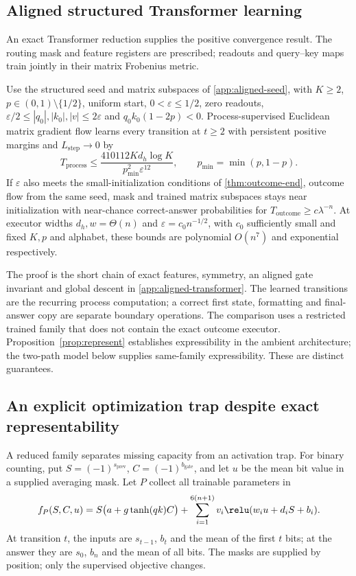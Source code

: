 \subsection{Aligned structured Transformer learning}
\label{sec:aligned-transformer}
An exact Transformer reduction supplies the positive convergence result.
The routing mask and feature registers are prescribed; readouts and query--key
maps train jointly in their matrix Frobenius metric.
\begin{theorem}
\label{thm:aligned-transformer}
Use the structured seed and matrix subspaces of \cref{app:aligned-seed}, with
$K\ge2$, $p\in(0,1)\setminus\{1/2\}$, uniform start, $0<\varepsilon\le1/2$,
zero readouts, $\varepsilon/2\le|q_0|,|k_0|,|v|\le2\varepsilon$ and
$q_0k_0(1-2p)<0$. Process-supervised Euclidean matrix gradient flow learns
every transition at $t\ge2$ with persistent positive margins and
$L_{\mathrm{step}}\to0$ by
\[
 T_{\mathrm{process}}\le
 \frac{410112K d_h\log K}{p_{\min}^2\varepsilon^{12}},
 \qquad p_{\min}=\min(p,1-p).
\]
If $\varepsilon$ also meets the small-initialization conditions of
\cref{thm:outcome-end}, outcome flow from the same seed, mask and trained
matrix subspaces stays near initialization with near-chance correct-answer
probabilities for $T_{\mathrm{outcome}}\ge c\lambda^{-n}$.
At executor widths $d_h,w=\Theta(n)$ and $\varepsilon=c_0n^{-1/2}$, with $c_0$
sufficiently small and fixed $K,p$ and alphabet, these bounds are polynomial $O(n^7)$
and exponential respectively.
\end{theorem}
The proof is the short chain of exact features, symmetry, an aligned gate
invariant and global descent in \cref{app:aligned-transformer}.
The learned transitions are the recurring process computation; a correct first
state, formatting and final-answer copy are separate boundary operations.
The comparison uses a restricted trained family that does not contain the
exact outcome executor. Proposition~\ref{prop:represent} establishes expressibility
in the ambient architecture; the two-path model below supplies same-family
expressibility. These are distinct guarantees.

\subsection{An explicit optimization trap despite exact representability}
\label{sec:two-path-trap}
A reduced family separates missing capacity from an activation trap. For binary
counting, put $S=(-1)^{s_{\mathrm{prev}}}$, $C=(-1)^{b_{\mathrm{gate}}}$,
and let $u$ be the mean bit value in a supplied averaging mask. Let $P$ collect all trainable parameters in
\begin{equation}
 f_P(S,C,u)=S\bigl(a+g\tanh(qk)C\bigr)
 +\sum_{i=1}^{6(n+1)}v_i\relu(w_i u+d_iS+b_i).
 \label{eq:two-path-model}
\end{equation}
At transition $t$, the inputs are $s_{t-1}$, $b_t$ and the mean of the first
$t$ bits; at the answer they are $s_0$, $b_n$ and the mean of all bits.
The masks are supplied by position; only the supervised objective changes.

